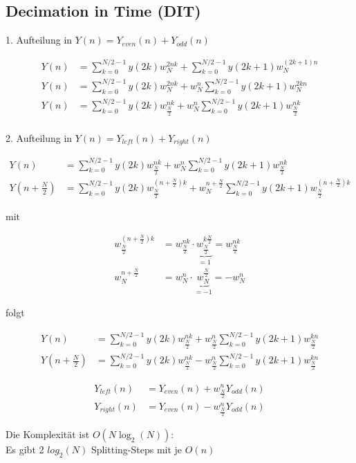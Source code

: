 \documentclass[10pt,a4paper]{article}
\begin{document}
\subsection{Decimation in Time (DIT)}
1. Aufteilung in $Y(n) = Y_{even}(n)+Y_{odd}(n)$
  \begin{mdframed}[style=exercise,font=\scriptsize]
    \begin{align}
        Y(n)&=\sum_{k=0}^{N/2-1} y(2k)w_N^{2nk}+\sum_{k=0}^{N/2-1} y(2k+1)w_N^{(2k+1)n}\\
        Y(n)&=\sum_{k=0}^{N/2-1} y(2k)w_N^{2nk}+w_N^{n}\sum_{k=0}^{N/2-1} y(2k+1)w_N^{2kn}\\
        Y(n)&=\sum_{k=0}^{N/2-1} y(2k)w_{\frac{N}{2}}^{nk}+w_N^{n}\sum_{k=0}^{N/2-1} y(2k+1)w_{\frac{N}{2}}^{nk}\\
    \end{align}
  \end{mdframed}
2. Aufteilung in $Y(n) = Y_{left}(n)+Y_{right}(n)$
  \begin{mdframed}[style=exercise,font=\scriptsize]
    \begin{align}
        Y(n)&=\sum_{k=0}^{N/2-1} y(2k)w_{\frac{N}{2}}^{nk}+w_N^{n}\sum_{k=0}^{N/2-1} y(2k+1)w_{\frac{N}{2}}^{nk}\\
        Y(n+\frac{N}{2})&=\sum_{k=0}^{N/2-1} y(2k)w_{\frac{N}{2}}^{(n+\frac{N}{2})k}+w_N^{n+\frac{N}{2}}\sum_{k=0}^{N/2-1} y(2k+1)w_{\frac{N}{2}}^{(n+\frac{N}{2})k}
    \end{align}
  \end{mdframed}
mit 
  \begin{mdframed}[style=exercise]
    \begin{align}
        w_{\frac{N}{2}}^{(n+\frac{N}{2})k} &= w_{\frac{N}{2}}^{nk} \cdot \underbrace{w_{\frac{N}{2}}^{k\frac{N}{2}}}_{=1} = w_{\frac{N}{2}}^{nk}\\
        w_N^{n+\frac{N}{2}} &= w_N^n \cdot \underbrace{w^{\frac{N}{2}}_N}_{=-1} = -w_N^n
    \end{align}
  \end{mdframed}
folgt 
  \begin{mdframed}[style=exercise,font=\scriptsize]
    \begin{align}
        Y(n)&=\sum_{k=0}^{N/2-1} y(2k) w_{\frac{N}{2}}^{nk} + w_{\frac{N}{2}}^{n} \sum_{k=0}^{N/2-1} y(2k+1)w_{\frac{N}{2}}^{kn}\\
        Y(n+\frac{N}{2})&=\sum_{k=0}^{N/2-1} y(2k) w_{\frac{N}{2}}^{nk} - w_{\frac{N}{2}}^{n} \sum_{k=0}^{N/2-1} y(2k+1)w_{\frac{N}{2}}^{kn}
    \end{align}
  \end{mdframed}
  \begin{mdframed}[style=exercise]
    \begin{align}
        Y_{left}(n) &= Y_{even}(n) + w_{\frac{N}{2}}^{n} Y_{odd}(n)\\ 
        Y_{right}(n) &= Y_{even}(n) - w_{\frac{N}{2}}^{n} Y_{odd}(n)
    \end{align}
  \end{mdframed}
Die Komplexität ist $O(N\log_2(N))$:\\ 
Es gibt 2 $log_2(N)$ Splitting-Steps mit je $O(n)$
\end{document}
